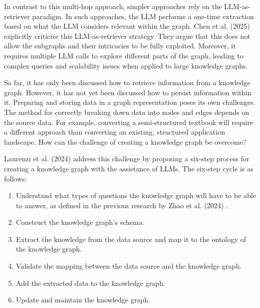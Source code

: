 In contrast to this multi-hop approach, simpler approaches rely on the LLM-as-retriever paradigm. In such approaches, the LLM performs a one-time extraction based on what the LLM considers relevant within the graph. Chen et al. (2025) \cite{chen2025gril} explicitly criticize this LLM-as-retriever strategy. They argue that this does not allow the subgraphs and their intricacies to be fully exploited. Moreover, it requires multiple LLM calls to explore different parts of the graph, leading to complex queries and scalability issues when applied to large knowledge graphs.



So far, it has only been discussed how to retrieve information from a knowledge graph. However, it has not yet been discussed how to persist information within it. Preparing and storing data in a graph representation poses its own challenges. The method for correctly breaking down data into nodes and edges depends on the source data. For example, converting a semi-structured textbook will require a different approach than converting an existing, structured application landscape. How can the challenge of creating a knowledge graph be overcome?


Laurenzi et al. (2024) \cite{laurenzi2024llm} address this challenge by proposing a six-step process for creating a knowledge graph with the assistance of LLMs. The six-step cycle is as follows:
\begin{enumerate}
	\item Understand what types of questions the knowledge graph will have to be able to answer, as defined in the previous research by Zhao et al. (2024) \cite{zhao2024retrieval}.
	\item Construct the knowledge graph's schema.
	\item Extract the knowledge from the data source and map it to the ontology of the knowledge graph.
	\item Validate the mapping between the data source and the knowledge graph.
	\item Add the extracted data to the knowledge graph.
	\item Update and maintain the knowledge graph.
\end{enumerate}


